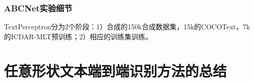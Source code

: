 \subsubsection{ABCNet实验细节}
TextPerceptron分为2个阶段：1）合成的150k合成数据集，15k的COCOText，7k的ICDAR-MLT预训练；2）相应的训练集训练。

\section{任意形状文本端到端识别方法的总结}
